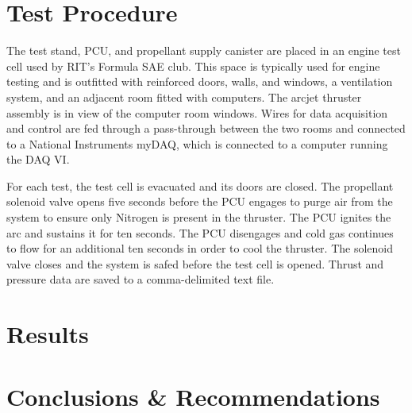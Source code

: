 \documentclass[journal]{IEEEtran}
\begin{document}

\section{Test Procedure}
The test stand, PCU, and propellant supply canister are placed in an engine test cell used by RIT's Formula SAE club.
This space is typically used for engine testing and is outfitted with reinforced doors, walls, and windows, a ventilation system, and an adjacent room fitted with computers.
The arcjet thruster assembly is in view of the computer room windows.
Wires for data acquisition and control are fed through a pass-through between the two rooms and connected to a National Instruments myDAQ, which is connected to a computer running the DAQ VI.\@

For each test, the test cell is evacuated and its doors are closed.
The propellant solenoid valve opens five seconds before the PCU engages to purge air from the system to ensure only Nitrogen is present in the thruster.
The PCU ignites the arc and sustains it for ten seconds.
The PCU disengages and cold gas continues to flow for an additional ten seconds in order to cool the thruster.
The solenoid valve closes and the system is safed before the test cell is opened.
Thrust and pressure data are saved to a comma-delimited text file.

\section{Results}

\section{Conclusions \& Recommendations}
\end{document}
